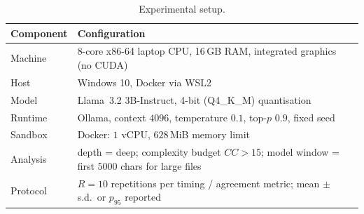 \begin{table}[!htbp]
  \centering
  \caption{Experimental setup.}
  \label{tab:setup}
  \renewcommand{\arraystretch}{1.15}
  \small
  \begin{tabularx}{\columnwidth}{@{}l X@{}}
    \toprule
    \textbf{Component} & \textbf{Configuration} \\
    \midrule
    Machine       & 8-core x86-64 laptop CPU, 16\,GB RAM, integrated
                    graphics (no CUDA) \\
    Host          & Windows 10, Docker via WSL2 \\
    Model         & \mbox{Llama 3.2} 3B-Instruct, 4-bit (Q4\_K\_M)
                    quantisation \\
    Runtime       & Ollama, context $4096$, temperature $0.1$,
                    top-$p$ $0.9$, fixed seed \\
    Sandbox       & Docker: $1$ vCPU, $628$\,MiB memory limit \\
    Analysis      & depth = deep; complexity budget $CC>15$;
                    model window = first $5000$ chars for large files \\
    Protocol      & $R=10$ repetitions per timing / agreement metric;
                    mean $\pm$ s.d.\ or $p_{95}$ reported \\
    \bottomrule
  \end{tabularx}
\end{table}
